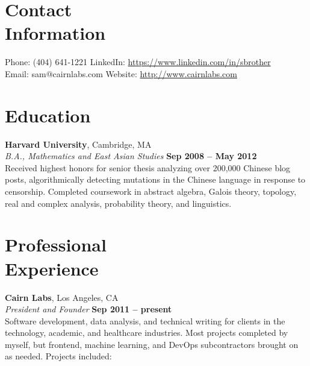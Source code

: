 \documentclass[margin,line]{resume}
\begin{document}
\begin{resume}
    \section{\mysidestyle Contact\\Information}

    Phone: (404) 641-1221       \hfill LinkedIn: \url{https://www.linkedin.com/in/sbrother} \\
    \noindent Email: sam@cairnlabs.com  \hfill Website: \url{http://www.cairnlabs.com} \vspace{0mm}\\\vspace{-4.5mm}

    \section{\mysidestyle Education}

    \textbf{Harvard University}, Cambridge, MA \vspace{2mm}\\\vspace{1mm}%
    \textsl{B.A., Mathematics and East Asian Studies} \hfill \textbf{Sep 2008 -- May 2012}\\
    Received highest honors for senior thesis analyzing over 200,000 Chinese blog posts, algorithmically detecting mutations in the Chinese language in response to censorship. Completed coursework in abstract algebra, Galois theory, topology, real and complex analysis, probability theory, and linguistics.

    \section{\mysidestyle Professional\\Experience}

    \textbf{Cairn Labs}, Los Angeles, CA \vspace{2mm}\\\vspace{1mm}%
    \textsl{President and Founder} \hfill \textbf{Sep 2011 -- present}\\
    Software development, data analysis, and technical writing for clients in the technology, academic, and healthcare industries. Most projects completed by myself, but frontend, machine learning, and DevOps subcontractors brought on as needed. Projects included:


\end{resume}
\end{document}
